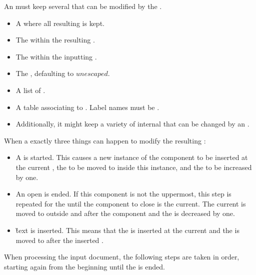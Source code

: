 

An  must keep several  that can be modified by the .

\begin{itemize}
\item A   where all resulting  is kept.
\item The  within the resulting .
\item The  within the inputting .
\item The , defaulting to \inline$unescaped$.
\item A list of .
\item A table associating  to . Label names must be .
\item Additionally, it might keep a variety of internal  that can be changed by an .
\end{itemize}

When  a  exactly three things can happen to modify the resulting :

\begin{itemize}
\item A  is started. This causes a new instance of the component to be inserted at the current , the  to be moved to inside this instance, and the  to be increased by one.
\item An open  is ended. If this component is not the uppermost, this step is repeated for the  until the component to close is the current. The current  is moved to outside and after the component and the  is decreased by one.
\item \G{text} is inserted. This means that the  is inserted at the current  and the  is moved to after the inserted .
\end{itemize}

When processing the input document, the following steps are taken in order, starting again from the beginning until the   is ended.

